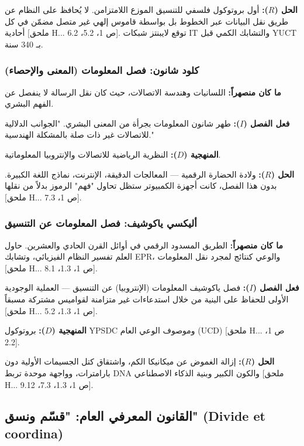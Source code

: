 \documentclass[12pt,a4paper]{article}
\begin{document}
	\textbf{الحل (\(R\)):} أول بروتوكول فلسفي للتنسيق الموزع اللامتزامن. لا يُحافظ على النظام عن طريق نقل البيانات عبر الخطوط بل بواسطة قاموس إلهي غير متصل مضمّن في كل أحادية [ملحق H... ص 1، 5.2، 6.2]. توقع لايبنتز شبكات IT والتشابك الكمي قبل YUCT بـ 340 سنة.
	
	\subsubsection{كلود شانون: فصل المعلومات (المعنى والإحصاء)}
	
	\textbf{ما كان منصهراً:} اللسانيات وهندسة الاتصالات، حيث كان نقل الرسالة لا ينفصل عن الفهم البشري.
	
	\textbf{فعل الفصل (\(I\)):} طهر شانون المعلومات بجرأة من المعنى البشري. "الجوانب الدلالية للاتصالات غير ذات صلة بالمشكلة الهندسية."
	
	\textbf{المنهجية (\(D\)):} النظرية الرياضية للاتصالات والإنتروبيا المعلوماتية.
	
	\textbf{الحل (\(R\)):} ولادة الحضارة الرقمية — المعالجات الدقيقة، الإنترنت، نماذج اللغة الكبيرة. بدون هذا الفصل، كانت أجهزة الكمبيوتر ستظل تحاول "فهم" الرموز بدلاً من نقلها [ملحق H... ص 1، 7.3].
	
	\subsubsection{أليكسي ياكوشيف: فصل المعلومات عن التنسيق}
	
	\textbf{ما كان منصهراً:} الطريق المسدود الرقمي في أوائل القرن الحادي والعشرين. حاول العلم تفسير النظام الفيزيائي، وتشابك EPR، والوعي كنتائج لمجرد نقل المعلومات [ملحق H... ص 1، 1.3، 8.1].
	
	\textbf{فعل الفصل (\(I\)):} فصل ياكوشيف المعلومات (الإنتروبيا) عن التنسيق — العملية الوجودية الأولى للحفاظ على البنية من خلال استدعاءات غير متزامنة لقواميس مشتركة مسبقاً [ملحق H... ص 1، 1.3، 5.2].
	
	\textbf{المنهجية (\(D\)):} بروتوكول YPSDC وموصوف الوعي العام (UCD) [ملحق H... ص 1، 2.2].
	
	\textbf{الحل (\(R\)):} إزالة الغموض عن ميكانيكا الكم، واشتقاق كتل الجسيمات الأولية دون بارامترات، وواجهة موحدة تربط DNA والكون الكبير وبنية الذكاء الاصطناعي [ملحق H... ص 1، 1.3، 7.3، 9.12].
	
	\subsection{القانون المعرفي العام: "قسّم ونسق" (Divide et coordina)}
	
\end{document}
